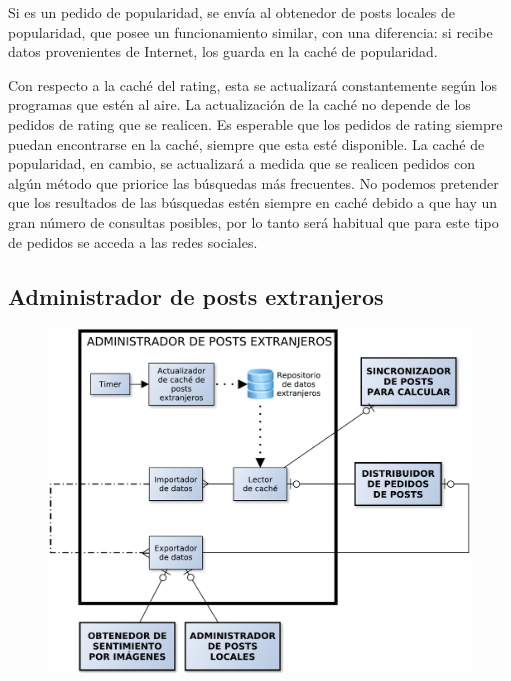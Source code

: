 Si es un pedido de popularidad, se envía al obtenedor de posts locales de popularidad, que posee un funcionamiento similar, con una diferencia: si recibe datos provenientes de Internet, los guarda en la caché de popularidad.

Con respecto a la caché del rating, esta se actualizará constantemente según los programas que estén al aire. La actualización de la caché no depende de los pedidos de rating que se realicen. Es esperable que los pedidos de rating siempre puedan encontrarse en la caché, siempre que esta esté disponible.
La caché de popularidad, en cambio, se actualizará a medida que se realicen pedidos con algún método que priorice las búsquedas más frecuentes. No podemos pretender que los resultados de las búsquedas estén siempre en caché debido a que hay un gran número de consultas posibles, por lo tanto será habitual que para este tipo de pedidos se acceda a las redes sociales. 

\subsection{Administrador de posts extranjeros}

\begin{figure}[H]
\centering
\includegraphics[width=\textwidth]{graph/administradorPostsExtranjeros.pdf}
\end{figure}

